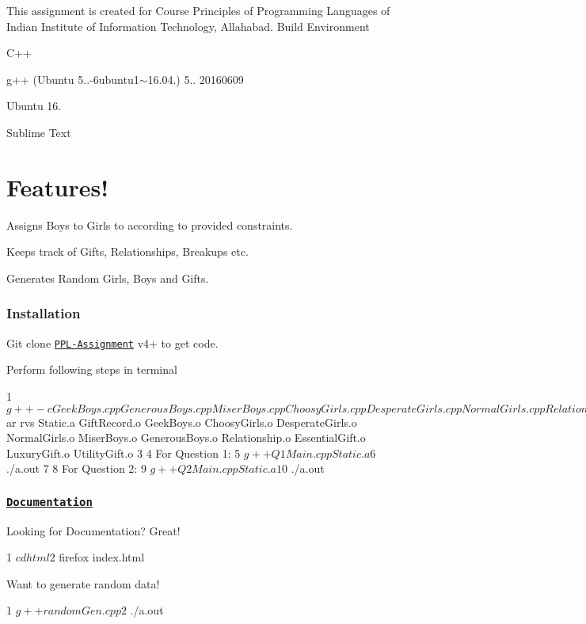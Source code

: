 This assignment is created for Course Principles of Programming Languages of Indian Institute of Information Technology, Allahabad. Build Environment


\begin{DoxyItemize}
\item C++
\item g++ (Ubuntu 5..-\/6ubuntu1$\sim$16.04.) 5.. 20160609
\item Ubuntu 16.
\item Sublime Text
\end{DoxyItemize}

\section*{Features!}


\begin{DoxyItemize}
\item Assigns Boys to Girls to according to provided constraints.
\item Keeps track of Gifts, Relationships, Breakups etc.
\item Generates Random Girls, Boys and Gifts.
\end{DoxyItemize}

\subsubsection*{Installation}

Git clone \href{https://github.com/PPL-IIITA/ppl-assignment-BelieveC}{\tt P\+P\+L-\/\+Assignment} v4+ to get code.

Perform following steps in terminal 
\begin{DoxyCode}
1 $ g++ -c GeekBoys.cpp GenerousBoys.cpp MiserBoys.cpp ChoosyGirls.cpp DesperateGirls.cpp NormalGirls.cpp
       Relationship.cpp GiftRecord.cpp LuxuryGift.cpp EssentialGift.cpp UtilityGift.cpp
2 $ ar rvs Static.a GiftRecord.o GeekBoys.o ChoosyGirls.o DesperateGirls.o NormalGirls.o MiserBoys.o
       GenerousBoys.o Relationship.o EssentialGift.o LuxuryGift.o UtilityGift.o
3 
4 For Question 1:
5 $ g++ Q1Main.cpp Static.a
6 $ ./a.out
7 
8 For Question 2:
9 $ g++ Q2Main.cpp Static.a
10 $ ./a.out
\end{DoxyCode}
 \subsubsection*{\href{https://believec.github.io/PPL-Assignment-Doc/}{\tt Documentation}}

Looking for Documentation? Great!


\begin{DoxyCode}
1 $ cd html
2 $ firefox index.html
\end{DoxyCode}


Want to generate random data!


\begin{DoxyCode}
1 $ g++ randomGen.cpp
2 $ ./a.out
\end{DoxyCode}
 